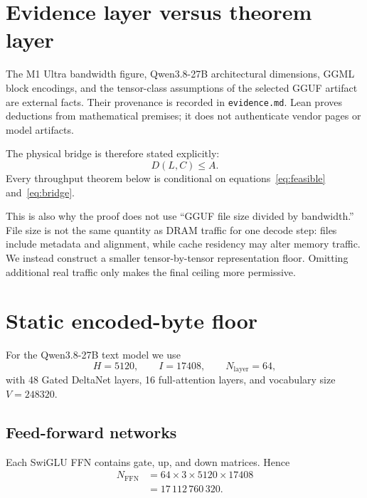 \documentclass[11pt,a4paper]{article}
\begin{document}
\section{Evidence layer versus theorem layer}

The M1 Ultra bandwidth figure, Qwen3.8-27B architectural dimensions, GGML block encodings, and the tensor-class assumptions of the selected GGUF artifact are external facts. Their provenance is recorded in \texttt{evidence.md}. Lean proves deductions from mathematical premises; it does not authenticate vendor pages or model artifacts.

The physical bridge is therefore stated explicitly:
\begin{equation}
  D(L,C)\le A.
  \label{eq:bridge}
\end{equation}
Every throughput theorem below is conditional on equations~\eqref{eq:feasible} and~\eqref{eq:bridge}.

This is also why the proof does not use ``GGUF file size divided by bandwidth.'' File size is not the same quantity as DRAM traffic for one decode step: files include metadata and alignment, while cache residency may alter memory traffic. We instead construct a smaller tensor-by-tensor representation floor. Omitting additional real traffic only makes the final ceiling more permissive.

\section{Static encoded-byte floor}

For the Qwen3.8-27B text model we use
\begin{equation}
  H=5120,\qquad I=17408,\qquad N_{\mathrm{layer}}=64,
\end{equation}
with 48 Gated DeltaNet layers, 16 full-attention layers, and vocabulary size $V=248320$.

\subsection{Feed-forward networks}
Each SwiGLU FFN contains gate, up, and down matrices. Hence
\begin{equation}
\begin{aligned}
N_{\mathrm{FFN}}
&=64\times3\times5120\times17408\\
&=17\,112\,760\,320.
\end{aligned}
\label{eq:ffn}
\end{equation}
\end{document}
